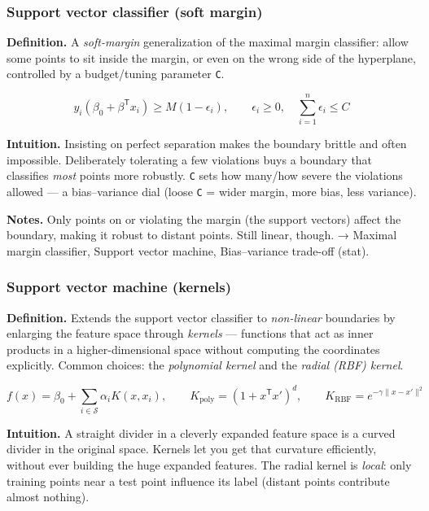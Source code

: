 \documentclass[
  10pt,
  letterpaper,
  onecolumn]{article}
\begin{document}
\hypertarget{support-vector-classifier-soft-margin}{%
\subsubsection{Support vector classifier (soft
margin)}\label{support-vector-classifier-soft-margin}}

\textbf{Definition.} A \emph{soft-margin} generalization of the maximal
margin classifier: allow some points to sit inside the margin, or even
on the wrong side of the hyperplane, controlled by a budget/tuning
parameter \texttt{C}.

\begin{equation*}
y_i(\beta_0+\beta^{\mathsf T}x_i)\ge M(1-\epsilon_i),
\qquad
\epsilon_i\ge 0,\quad \sum_{i=1}^{n}\epsilon_i\le C
\end{equation*}

\textbf{Intuition.} Insisting on perfect separation makes the boundary
brittle and often impossible. Deliberately tolerating a few violations
buys a boundary that classifies \emph{most} points more robustly.
\texttt{C} sets how many/how severe the violations allowed --- a
bias--variance dial (loose \texttt{C} = wider margin, more bias, less
variance).

\textbf{Notes.} Only points on or violating the margin (the support
vectors) affect the boundary, making it robust to distant points. Still
linear, though. → Maximal margin classifier, Support vector machine,
Bias--variance trade-off (stat).

\hypertarget{support-vector-machine-kernels}{%
\subsubsection{Support vector machine
(kernels)}\label{support-vector-machine-kernels}}

\textbf{Definition.} Extends the support vector classifier to
\emph{non-linear} boundaries by enlarging the feature space through
\emph{kernels} --- functions that act as inner products in a
higher-dimensional space without computing the coordinates explicitly.
Common choices: the \emph{polynomial kernel} and the \emph{radial (RBF)
kernel}.

\begin{equation*}
f(x)=\beta_0+\sum_{i\in\mathcal{S}}\alpha_i K(x,x_i),
\qquad
K_{\text{poly}}=(1+x^{\mathsf T}x')^d,
\qquad
K_{\text{RBF}}=e^{-\gamma\|x-x'\|^2}
\end{equation*}

\textbf{Intuition.} A straight divider in a cleverly expanded feature
space is a curved divider in the original space. Kernels let you get
that curvature efficiently, without ever building the huge expanded
features. The radial kernel is \emph{local}: only training points near a
test point influence its label (distant points contribute almost
nothing).
\end{document}
